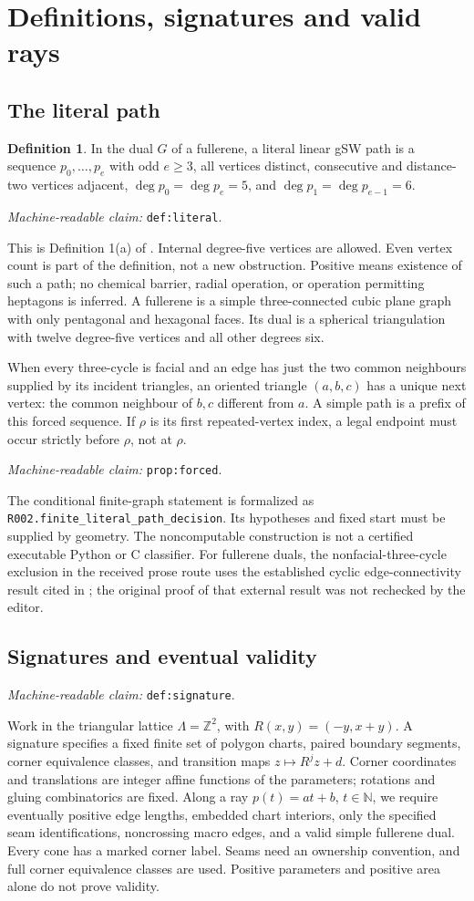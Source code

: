 \documentclass[11pt]{amsart}
\newcommand{\Z}{\mathbb Z}
\newcommand{\N}{\mathbb N}
\newcommand{\record}[1]{\nolinkurl{#1}}
\newcommand{\claimid}[1]{\par\nopagebreak\noindent\textit{Machine-readable claim:} \record{#1}.\par}
\theoremstyle{definition}\newtheorem{definition}{Definition}
\begin{document}
\section{Definitions, signatures and valid rays}\label{sec:definitions}
\subsection{The literal path}
\begin{definition}\label{def:literal}
In the dual $G$ of a fullerene, a literal linear gSW path is a sequence
$p_0,\ldots,p_e$ with odd $e\ge3$, all vertices distinct, consecutive
and distance-two vertices adjacent, $\deg p_0=\deg p_e=5$, and
$\deg p_1=\deg p_{e-1}=6$.
\end{definition}
\claimid{def:literal}
This is Definition 1(a) of \cite{BBS}. Internal degree-five vertices
are allowed. Even vertex count is part of the definition, not a new
obstruction. Positive means existence of such a path; no chemical
barrier, radial operation, or operation permitting heptagons is inferred.
A fullerene is a simple three-connected cubic plane graph with only
pentagonal and hexagonal faces. Its dual is a spherical triangulation
with twelve degree-five vertices and all other degrees six.

When every three-cycle is facial and an edge has just the two common
neighbours supplied by its incident triangles, an oriented triangle
$(a,b,c)$ has a unique next vertex: the common neighbour of $b,c$
different from $a$. A simple path is a prefix of this forced sequence.
If $\rho$ is its first repeated-vertex index, a legal endpoint must
occur strictly before $\rho$, not at $\rho$.
\label{prop:forced}\claimid{prop:forced}
The conditional finite-graph statement is formalized as
\record{R002.finite_literal_path_decision}. Its hypotheses and fixed
start must be supplied by geometry. The noncomputable construction
is not a certified executable Python or C classifier. For fullerene
duals, the nonfacial-three-cycle exclusion in the received prose route
uses the established cyclic edge-connectivity result cited in
\cite{Connectivity}; the original proof of that external result was
not rechecked by the editor.

\subsection{Signatures and eventual validity}\label{def:signature}
\claimid{def:signature}
Work in the triangular lattice $\Lambda=\Z^2$, with
$R(x,y)=(-y,x+y)$. A signature specifies a fixed finite set of polygon
charts, paired boundary segments, corner equivalence classes, and
transition maps $z\mapsto R^jz+d$. Corner coordinates and translations
are integer affine functions of the parameters; rotations and gluing
combinatorics are fixed. Along a ray $p(t)=at+b$, $t\in\N$, we require
eventually positive edge lengths, embedded chart interiors, only the
specified seam identifications, noncrossing macro edges, and a valid
simple fullerene dual. Every cone has a marked corner label. Seams
need an ownership convention, and full corner equivalence classes are
used. Positive parameters and positive area alone do not prove validity.
\end{document}
